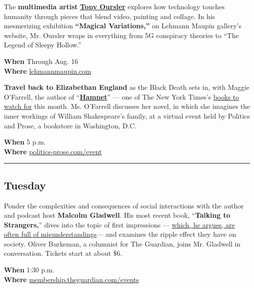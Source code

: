 The \textbf{multimedia artist}
\textbf{\href{https://www.nytimes3xbfgragh.onion/2015/06/09/t-magazine/tony-oursler-home-studio-tour.html}{Tony
Oursler}} explores how technology touches humanity through pieces that
blend video, painting and collage. In his mesmerizing exhibition
\textbf{``Magical Variations,''} on Lehmann Maupin gallery's website,
Mr. Oursler wraps in everything from 5G conspiracy theories to ``The
Legend of Sleepy Hollow.''

\textbf{When} Through Aug. 16\\
\textbf{Where}
\href{https://www.lehmannmaupin.com/viewing-room/tony-oursler}{lehmannmaupin.com}

\textbf{Travel back to Elizabethan England} as the Black Death sets in,
with Maggie O'Farrell, the author of
``\textbf{\href{https://www.nytimes3xbfgragh.onion/2020/07/17/books/review/hamnet-maggie-ofarrell.html}{Hamnet}}''
--- one of The New York Times's
\href{https://www.nytimes3xbfgragh.onion/2020/06/24/books/new-july-books.html}{books
to watch for} this month. Ms. O'Farrell discusses her novel, in which
she imagines the inner workings of William Shakespeare's family, at a
virtual event held by Politics and Prose, a bookstore in Washington,
D.C.

\textbf{When} 5 p.m.\\
\textbf{Where}
\href{https://www.politics-prose.com/event/book/pp-live-maggie-ofarrell-hamnet-in-conversation-amity-gaige}{politics-prose.com/event}

\begin{center}\rule{0.5\linewidth}{\linethickness}\end{center}

\hypertarget{tuesday}{%
\subsection{Tuesday}\label{tuesday}}

Ponder the complexities and consequences of social interactions with the
author and podcast host \textbf{Malcolm Gladwell}. His most recent book,
``\textbf{Talking to Strangers,}'' dives into the topic of first
impressions ---
\href{https://www.nytimes3xbfgragh.onion/2019/08/30/business/malcolm-gladwell-talking-to-strangers.html}{which,
he argues, are often full of misunderstandings}--- and examines the
ripple effect they have on society. Oliver Burkeman, a columnist for The
Guardian, joins Mr. Gladwell in conversation. Tickets start at about
\$6.

\textbf{When} 1:30 p.m.\\
\textbf{Where}
\href{https://membership.theguardian.com/events}{membership.theguardian.com/events}

